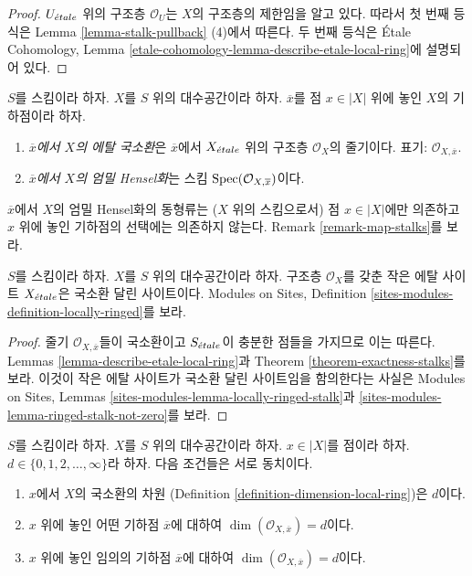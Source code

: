 \begin{proof}
$U_{\acute{e}tale}$ 위의 구조층 $\mathcal{O}_U$는 $X$의 구조층의 제한임을
알고 있다. 따라서 첫 번째 등식은 Lemma
\ref{lemma-stalk-pullback} (4)에서 따른다.
두 번째 등식은 \'Etale Cohomology, Lemma
\ref{etale-cohomology-lemma-describe-etale-local-ring}에 설명되어 있다.
\end{proof}

\begin{definition}
\label{definition-etale-local-rings}
$S$를 스킴이라 하자.
$X$를 $S$ 위의 대수공간이라 하자.
$\overline{x}$를 점 $x \in |X|$ 위에 놓인 $X$의 기하점이라 하자.
\begin{enumerate}
\item {\it $\overline{x}$에서 $X$의 에탈 국소환}은
$\overline{x}$에서 $X_{\acute{e}tale}$ 위의 구조층 $\mathcal{O}_X$의 줄기이다.
표기: $\mathcal{O}_{X, \overline{x}}$.
\item {\it $\overline{x}$에서 $X$의 엄밀 Hensel화}는 스킴
$\mathop{\mathrm{Spec}}(\mathcal{O}_{X, \overline{x}})$이다.
\end{enumerate}
\end{definition}

\noindent
$\overline{x}$에서 $X$의 엄밀 Hensel화의 동형류는
($X$ 위의 스킴으로서) 점 $x \in |X|$에만 의존하고
$x$ 위에 놓인 기하점의 선택에는 의존하지 않는다.
Remark \ref{remark-map-stalks}를 보라.

\begin{lemma}
\label{lemma-etale-site-locally-ringed}
$S$를 스킴이라 하자.
$X$를 $S$ 위의 대수공간이라 하자.
구조층 $\mathcal{O}_X$를 갖춘 작은 에탈 사이트 $X_{\acute{e}tale}$은
국소환 달린 사이트이다. Modules on Sites, Definition
\ref{sites-modules-definition-locally-ringed}를 보라.
\end{lemma}

\begin{proof}
줄기 $\mathcal{O}_{X, \overline{x}}$들이 국소환이고
$S_{\acute{e}tale}$이 충분한 점들을 가지므로 이는 따른다.
Lemmas \ref{lemma-describe-etale-local-ring}과
Theorem \ref{theorem-exactness-stalks}를 보라.
이것이 작은 에탈 사이트가 국소환 달린 사이트임을 함의한다는 사실은
Modules on Sites, Lemmas
\ref{sites-modules-lemma-locally-ringed-stalk}과
\ref{sites-modules-lemma-ringed-stalk-not-zero}를 보라.
\end{proof}

\begin{lemma}
\label{lemma-dimension-local-ring}
$S$를 스킴이라 하자. $X$를 $S$ 위의 대수공간이라 하자.
$x \in |X|$를 점이라 하자.
$d \in \{0, 1, 2, \ldots, \infty\}$라 하자.
다음 조건들은 서로 동치이다.
\begin{enumerate}
\item $x$에서 $X$의 국소환의 차원
(Definition \ref{definition-dimension-local-ring})은 $d$이다.
\item $x$ 위에 놓인 어떤 기하점 $\overline{x}$에 대하여
$\dim(\mathcal{O}_{X, \overline{x}}) = d$이다.
\item $x$ 위에 놓인 임의의 기하점 $\overline{x}$에 대하여
$\dim(\mathcal{O}_{X, \overline{x}}) = d$이다.
\end{enumerate}
\end{lemma}

